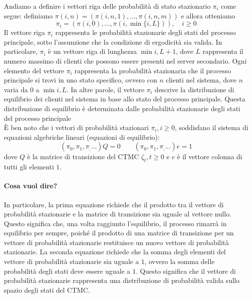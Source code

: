 \documentclass[11pt]{article}
\begin{document}
\noindent Andiamo a definire i vettori riga delle probabilità di stato stazionario $\pi_i$ come segue: definiamo $\pi(i,n) = (\pi(i,n,1), ..., \pi(i,n,m))$ e allora otteniamo
\begin{equation}
    \pi_i = (\pi(i,0), ..., \pi(i, \min \{i,L\})), \quad i \geq 0
\end{equation}
Il vettore riga $\pi_i$ rappresenta le probabilità stazionarie degli stati del processo principale, sotto l'assunzione che la condizione di ergodicità sia valida. In particolare, $\pi_i$ è un vettore riga di lunghezza $\min{i,L}+1$, dove $L$ rappresenta il numero massimo di clienti che possono essere presenti nel server secondario. Ogni elemento del vettore $\pi_i$ rappresenta la probabilità stazionaria che il processo principale si trovi in uno stato specifico, ovvero con $n$ clienti nel sistema, dove $n$ varia da $0$ a $\min{i,L}$. In altre parole, il vettore $\pi_i$ descrive la distribuzione di equilibrio dei clienti nel sistema in base allo stato del processo principale. Questa distribuzione di equilibrio è determinata dalle probabilità stazionarie degli stati del processo principale \\

\noindent È ben noto che i vettori di probabilità stazionari $\pi_i, i \geq 0$, soddisfano il sistema di equazioni algebriche lineari (equazioni di equilibrio):
\begin{equation}
    (\pi_0, \pi_1, \pi_, \dots)Q = 0 \qquad (\pi_0, \pi_1, \pi_, \dots)e = 1
\end{equation}
dove $Q$ è la matrice di transizione del CTMC $\zeta_t, t \geq 0$ e $e$ è il vettore colonna di tutti gli elementi $1$.

\paragraph{Cosa vuol dire?} In particolare, la prima equazione richiede che il prodotto tra il vettore di probabilità stazionarie e la matrice di transizione sia uguale al vettore nullo. Questo significa che, una volta raggiunto l'equilibrio, il processo rimarrà in equilibrio per sempre, poiché il prodotto di una matrice di transizione per un vettore di probabilità stazionarie restituisce un nuovo vettore di probabilità stazionarie. La seconda equazione richiede che la somma degli elementi del vettore di probabilità stazionarie sia uguale a $1$, ovvero la somma delle probabilità degli stati deve essere uguale a $1$. Questo significa che il vettore di probabilità stazionarie rappresenta una distribuzione di probabilità valida sullo spazio degli stati del CTMC. \\
\end{document}
